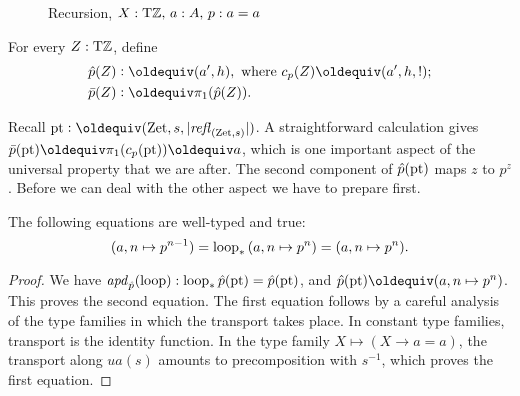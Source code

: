 \documentclass[a4,12pt]{amsart}
\begin{document}
\begin{figure}
\caption{\label{fig:TorZ-recursion}Recursion, $X:{\mathrm{T}\mathbb{Z}},\, a:A,\, p:a=a$}
\end{figure}


\begin{definition}\label{def:TBN}
For every $Z:{\mathrm{T}\mathbb{Z}}$, define
\begin{align*}\label{eq:TBD}
\hat{p}(Z)&\defeq (a',h), 
\text{~where $c_p(Z)\jdeq (a',h,!)$;}\\
\bar{p}(Z)&\defeq \pi_1 (\hat{p}(Z)).
\end{align*}
\end{definition}

Recall $\pt\defeq (\zet,s,\trunc{\refl{(\zet,s)}})$.
A straightforward calculation gives 
$\bar{p}(\pt)\jdeq \pi_1 (c_p(\pt)) \jdeq a$, which is one important
aspect of the universal property that we are after.
The second component of $\hat p({\mathord{\mathrm{pt}}})$ maps $z$ to $p^z$.
Before we can deal with the other aspect we have to prepare first.



\begin{lemma}\label{lem:TBN}
The following equations are well-typed and true:
\[
(a,n\mapsto p^{n-1}) = \mathrm{loop}_*\, (a,n\mapsto p^n) = (a,n\mapsto p^n).
\]
\end{lemma}
\begin{proof}
We have $\mathop{{\it apd}_{\hat{p}}}(\mathrm{loop}) : \mathrm{loop}_*\,\hat{p}({\mathord{\mathrm{pt}}}) = \hat{p}({\mathord{\mathrm{pt}}})$,
and $\hat{p}(\pt) \jdeq (a,n\mapsto p^n)$. This proves the second equation.
The first equation follows by a careful analysis of the type families
in which the transport takes place. In constant type families, transport
is the identity function. In the type family $X\mapsto (X\to a=a)$,
the transport along $ua(s)$ amounts to precomposition with $s^{-1}$,
which proves the first equation.
\end{proof}
\end{document}
